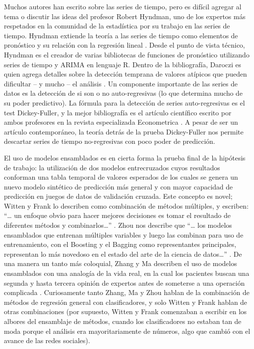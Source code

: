 Muchos autores han escrito sobre las series de tiempo, pero es difícil agregar al tema o discutir las ideas del profesor Robert Hyndman, uno de los expertos más respetados en la comunidad de la estadística por su trabajo en las series de tiempo. Hyndman extiende la teoría a las series de tiempo como elementos de pronóstico y su relación con la regresión lineal \cite{hyndman}. Desde el punto de vista técnico, Hyndman es el creador de varias bibliotecas de funciones de pronóstico utilizando series de tiempo y ARIMA en lenguaje R. Dentro de la bibliografía, Daroczi es quien agrega detalles sobre la detección temprana de valores atípicos que pueden dificultar – y mucho – el análisis \cite{daroczi}. Un componente importante de las series de datos es la detección de si son o no auto-regresivas (lo que determina mucho de su poder predictivo). La fórmula para la detección de series auto-regresivas es el test Dickey-Fuller, y la mejor bibliografía es el artículo científico escrito por ambos profesores en la revista especializada Econometrica \cite{dickeyfuller}. A pesar de ser un artículo contemporáneo, la teoría detrás de la prueba Dickey-Fuller nos permite descartar series de tiempo no-regresivas con poco poder de predicción.

El uso de modelos ensamblados es en cierta forma la prueba final de la hipótesis de trabajo: la utilización de dos modelos entrecruzados cuyos resultados conforman una tabla temporal de valores esperados de los cuales se genera un nuevo modelo sintético de predicción más general y con mayor capacidad de predicción en juegos de datos de validación cruzada. Este concepto es novel; Witten y Frank lo describen como combinación de métodos múltiples, y escriben: “… un enfoque obvio para hacer mejores decisiones es tomar el resultado de diferentes métodos y combinarlos…” \cite{datamining}. Zhou nos describe que “… los modelos ensamblados que entrenan múltiples variables y luego las combinan para uso de entrenamiento, con el Boosting y el Bagging como representantes principales, representan lo más novedoso en el estado del arte de la ciencia de datos…” \cite[pag. 5]{ensembleMethods}. De una manera un tanto más coloquial, Zhang y Ma describen el uso de modelos ensamblados con una analogía de la vida real, en la cual los pacientes buscan una segunda y hasta tercera opinión de expertos antes de someterse a una operación complicada \cite{ensembleMachineLearning}. Curiosamente tanto Zhang, Ma y Zhou hablan de la combinación de métodos de regresión general con clasificadores, y solo Witten y Frank hablan de otras combinaciones (por supuesto, Witten y Frank comenzaban a escribir en los albores del ensamblaje de métodos, cuando los clasificadores no estaban tan de moda porque el análisis era mayoritariamente de números, algo que cambió con el avance de las redes sociales).

